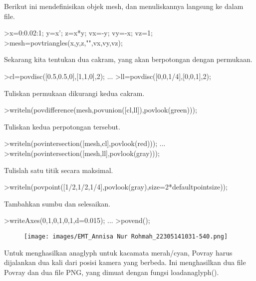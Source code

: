 \documentclass[a4paper,10pt]{article}
\begin{document}
\begin{eulernotebook}
\begin{eulercomment}
Berikut ini mendefinisikan objek mesh, dan menuliskannya langsung ke
dalam file.
\end{eulercomment}
\begin{eulerprompt}
>x=0:0.02:1; y=x'; z=x*y; vx=-y; vy=-x; vz=1;
>mesh=povtriangles(x,y,z,"",vx,vy,vz);
\end{eulerprompt}
\begin{eulercomment}
Sekarang kita tentukan dua cakram, yang akan berpotongan dengan
permukaan.
\end{eulercomment}
\begin{eulerprompt}
>cl=povdisc([0.5,0.5,0],[1,1,0],2); ...
>ll=povdisc([0,0,1/4],[0,0,1],2);
\end{eulerprompt}
\begin{eulercomment}
Tuliskan permukaan dikurangi kedua cakram.
\end{eulercomment}
\begin{eulerprompt}
>writeln(povdifference(mesh,povunion([cl,ll]),povlook(green)));
\end{eulerprompt}
\begin{eulercomment}
Tuliskan kedua perpotongan tersebut.
\end{eulercomment}
\begin{eulerprompt}
>writeln(povintersection([mesh,cl],povlook(red))); ...
>writeln(povintersection([mesh,ll],povlook(gray)));
\end{eulerprompt}
\begin{eulercomment}
Tulislah satu titik secara maksimal.
\end{eulercomment}
\begin{eulerprompt}
>writeln(povpoint([1/2,1/2,1/4],povlook(gray),size=2*defaultpointsize));
\end{eulerprompt}
\begin{eulercomment}
Tambahkan sumbu dan selesaikan.
\end{eulercomment}
\begin{eulerprompt}
>writeAxes(0,1,0,1,0,1,d=0.015); ...
>povend();
\end{eulerprompt}
\begin{figure}[h]
    \centering
    \texttt{[image: images/EMT\_Annisa Nur Rohmah\_22305141031-540.png]}
\end{figure}
\begin{eulercomment}
Untuk menghasilkan anaglyph untuk kacamata merah/cyan, Povray harus
dijalankan dua kali dari posisi kamera yang berbeda. Ini menghasilkan
dua file Povray dan dua file PNG, yang dimuat dengan fungsi
loadanaglyph().


\end{eulercomment}
\end{eulernotebook}
\end{document}
